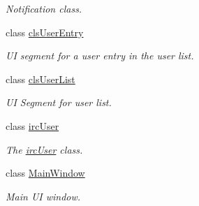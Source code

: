 \begin{DoxyCompactItemize}
\begin{DoxyCompactList}\small\item\em Notification class. \end{DoxyCompactList}\item 
class \hyperlink{classclient_1_1cls_user_entry}{cls\-User\-Entry}
\begin{DoxyCompactList}\small\item\em U\-I segment for a user entry in the user list. \end{DoxyCompactList}\item 
class \hyperlink{classclient_1_1cls_user_list}{cls\-User\-List}
\begin{DoxyCompactList}\small\item\em U\-I Segment for user list. \end{DoxyCompactList}\item 
class \hyperlink{classclient_1_1irc_user}{irc\-User}
\begin{DoxyCompactList}\small\item\em The \hyperlink{classclient_1_1irc_user}{irc\-User} class. \end{DoxyCompactList}\item 
class \hyperlink{classclient_1_1_main_window}{Main\-Window}
\begin{DoxyCompactList}\small\item\em Main U\-I window. \end{DoxyCompactList}\end{DoxyCompactItemize}
